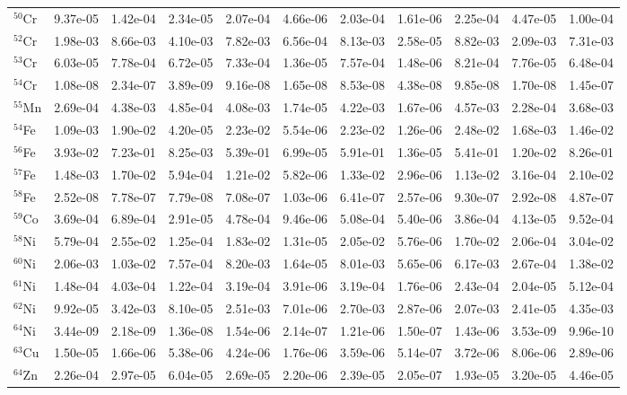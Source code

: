 \begin{landscape}
\begin{table}
\begin{tabular}{l|cc|cc|cc|cc|cc}
$^{50}$Cr & 9.37e-05 & 1.42e-04 & 2.34e-05 & 2.07e-04 & 4.66e-06 & 2.03e-04 & 1.61e-06 & 2.25e-04 & 4.47e-05 & 1.00e-04\\
$^{52}$Cr & 1.98e-03 & 8.66e-03 & 4.10e-03 & 7.82e-03 & 6.56e-04 & 8.13e-03 & 2.58e-05 & 8.82e-03 & 2.09e-03 & 7.31e-03\\
$^{53}$Cr & 6.03e-05 & 7.78e-04 & 6.72e-05 & 7.33e-04 & 1.36e-05 & 7.57e-04 & 1.48e-06 & 8.21e-04 & 7.76e-05 & 6.48e-04\\
$^{54}$Cr & 1.08e-08 & 2.34e-07 & 3.89e-09 & 9.16e-08 & 1.65e-08 & 8.53e-08 & 4.38e-08 & 9.85e-08 & 1.70e-08 & 1.45e-07\\
$^{55}$Mn & 2.69e-04 & 4.38e-03 & 4.85e-04 & 4.08e-03 & 1.74e-05 & 4.22e-03 & 1.67e-06 & 4.57e-03 & 2.28e-04 & 3.68e-03\\
$^{54}$Fe & 1.09e-03 & 1.90e-02 & 4.20e-05 & 2.23e-02 & 5.54e-06 & 2.23e-02 & 1.26e-06 & 2.48e-02 & 1.68e-03 & 1.46e-02\\
$^{56}$Fe & 3.93e-02 & 7.23e-01 & 8.25e-03 & 5.39e-01 & 6.99e-05 & 5.91e-01 & 1.36e-05 & 5.41e-01 & 1.20e-02 & 8.26e-01\\
$^{57}$Fe & 1.48e-03 & 1.70e-02 & 5.94e-04 & 1.21e-02 & 5.82e-06 & 1.33e-02 & 2.96e-06 & 1.13e-02 & 3.16e-04 & 2.10e-02\\
$^{58}$Fe & 2.52e-08 & 7.78e-07 & 7.79e-08 & 7.08e-07 & 1.03e-06 & 6.41e-07 & 2.57e-06 & 9.30e-07 & 2.92e-08 & 4.87e-07\\
$^{59}$Co & 3.69e-04 & 6.89e-04 & 2.91e-05 & 4.78e-04 & 9.46e-06 & 5.08e-04 & 5.40e-06 & 3.86e-04 & 4.13e-05 & 9.52e-04\\
$^{58}$Ni & 5.79e-04 & 2.55e-02 & 1.25e-04 & 1.83e-02 & 1.31e-05 & 2.05e-02 & 5.76e-06 & 1.70e-02 & 2.06e-04 & 3.04e-02\\
$^{60}$Ni & 2.06e-03 & 1.03e-02 & 7.57e-04 & 8.20e-03 & 1.64e-05 & 8.01e-03 & 5.65e-06 & 6.17e-03 & 2.67e-04 & 1.38e-02\\
$^{61}$Ni & 1.48e-04 & 4.03e-04 & 1.22e-04 & 3.19e-04 & 3.91e-06 & 3.19e-04 & 1.76e-06 & 2.43e-04 & 2.04e-05 & 5.12e-04\\
$^{62}$Ni & 9.92e-05 & 3.42e-03 & 8.10e-05 & 2.51e-03 & 7.01e-06 & 2.70e-03 & 2.87e-06 & 2.07e-03 & 2.41e-05 & 4.35e-03\\
$^{64}$Ni & 3.44e-09 & 2.18e-09 & 1.36e-08 & 1.54e-06 & 2.14e-07 & 1.21e-06 & 1.50e-07 & 1.43e-06 & 3.53e-09 & 9.96e-10\\
$^{63}$Cu & 1.50e-05 & 1.66e-06 & 5.38e-06 & 4.24e-06 & 1.76e-06 & 3.59e-06 & 5.14e-07 & 3.72e-06 & 8.06e-06 & 2.89e-06\\
$^{64}$Zn & 2.26e-04 & 2.97e-05 & 6.04e-05 & 2.69e-05 & 2.20e-06 & 2.39e-05 & 2.05e-07 & 1.93e-05 & 3.20e-05 & 4.46e-05\\

\end{tabular}
\end{table}
\end{landscape}
